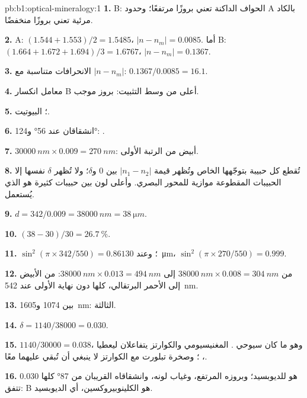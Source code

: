 \begin{solution}{pb:b1:optical-mineralogy:1}
\textbf{1.}  B: الحواف الداكنة تعني بروزًا مرتفعًا؛ وحدود A بالكاد مرئية تعني بروزًا منخفضًا.

\textbf{2.} A: $(1.544 + 1.553)/2 = 1.5485$، $|n - n_m| = 0.0085$. أما B:
$(1.664 + 1.672 + 1.694)/3 = 1.6767$، $|n - n_m| = 0.1367$.

\textbf{3.} الانحرافات متناسبة مع $|n - n_m|$: $0.1367/0.0085 =
16.1$.

\textbf{4.} معامل انكسار B أعلى من وسط التثبيت: بروز موجب.

\textbf{5.} ؛ البيوتيت.

\textbf{6.} انشقاقان عند \ang{56} و\ang{124}: .

\textbf{7.} $\qty{30000}{nm}\times0.009 = \qty{270}{nm}$: أبيض من الرتبة الأولى.

\textbf{8.} تُقطع كل حبيبة بتوجّهها الخاص وتُظهر قيمة $|n_1 - n_2|$ بين 0 و$\delta$؛ ولا تُظهر $\delta$ نفسها إلا الحبيبات المقطوعة موازية للمحور البصري. وأعلى لون بين حبيبات كثيرة هو الذي يُستعمل.

\textbf{9.} $d = 342/0.009 = \qty{38000}{nm} = \qty{38}{\micro m}$.

\textbf{10.} $(38 - 30)/30 = \qty{26.7}{\percent}$.

\textbf{11.} $\sin^2(\pi\times342/550) = 0.861$؛ وعند \qty{30}{\micro m}،
$\sin^2(\pi\times270/550) = 0.999$.

\textbf{12.} من $\qty{38000}{nm}\times0.008 = \qty{304}{nm}$ إلى
$\qty{38000}{nm}\times0.013 = \qty{494}{nm}$: من الأبيض إلى الأحمر البرتقالي، كلها دون نهاية  الأولى عند \qty{542}{nm}.

\textbf{13.} بين 1074 و\qty{1605}{nm}:  الثالثة.

\textbf{14.} $\delta = 1140/38000 = 0.030$.

\textbf{15.} $1140/30000 = 0.038$، وهو ما كان سيوحي .  المغنيسيومي والكوارتز يتفاعلان ليعطيا ،
؛ وصخرة تبلورت مع الكوارتز لا ينبغي أن تُبقي عليهما معًا.

\textbf{16.} $0.030$ هو  للديوبسيد؛ وبروزه المرتفع، وغياب لونه، وانشقاقاه القريبان من \ang{87} كلها تتفق: B هو الكلينوبيروكسين، أي الديوبسيد.


\end{solution}
